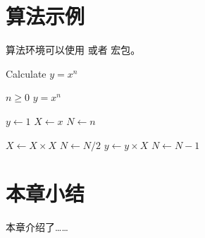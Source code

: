 \section{算法示例}

算法环境可以使用  或者  宏包。

\renewcommand{\algorithmicrequire}{\textbf{输入：}\unskip}
\renewcommand{\algorithmicensure}{\textbf{输出：}\unskip}

\begin{algorithm}
	\caption{Calculate $y = x^n$}
	\label{alg1}
	\small
	\begin{algorithmic}
		\REQUIRE $n \geq 0$
		\ENSURE $y = x^n$
		
		\STATE $y \leftarrow 1$
		\STATE $X \leftarrow x$
		\STATE $N \leftarrow n$
		
		\STATE $X \leftarrow X \times X$
		\STATE $N \leftarrow N / 2$
		\ELSE[$N$ is odd]
		\STATE $y \leftarrow y \times X$
		\STATE $N \leftarrow N - 1$
		\ENDIF
		\ENDWHILE
	\end{algorithmic}
\end{algorithm}

\section{本章小结}

本章介绍了……